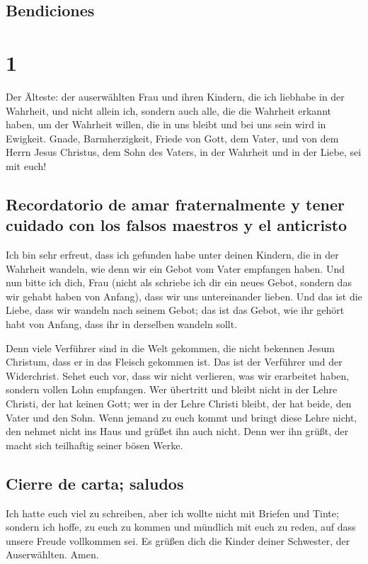 \hypertarget{bendiciones}{%
\subsection{Bendiciones}\label{bendiciones}}

\hypertarget{section}{%
\section{1}\label{section}}

 Der Älteste: der auserwählten Frau und ihren Kindern, die
ich liebhabe in der Wahrheit, und nicht allein ich, sondern auch alle,
die die Wahrheit erkannt haben,  um der Wahrheit willen,
die in uns bleibt und bei uns sein wird in Ewigkeit. 
Gnade, Barmherzigkeit, Friede von Gott, dem Vater, und von dem Herrn
Jesus Christus, dem Sohn des Vaters, in der Wahrheit und in der Liebe,
sei mit euch!

\hypertarget{recordatorio-de-amar-fraternalmente-y-tener-cuidado-con-los-falsos-maestros-y-el-anticristo}{%
\subsection{Recordatorio de amar fraternalmente y tener cuidado con los
falsos maestros y el
anticristo}\label{recordatorio-de-amar-fraternalmente-y-tener-cuidado-con-los-falsos-maestros-y-el-anticristo}}

 Ich bin sehr erfreut, dass ich gefunden habe unter deinen
Kindern, die in der Wahrheit wandeln, wie denn wir ein Gebot vom Vater
empfangen haben.  Und nun bitte ich dich, Frau (nicht als
schriebe ich dir ein neues Gebot, sondern das wir gehabt haben von
Anfang), dass wir uns untereinander lieben.  Und das ist
die Liebe, dass wir wandeln nach seinem Gebot; das ist das Gebot, wie
ihr gehört habt von Anfang, dass ihr in derselben wandeln sollt.

 Denn viele Verführer sind in die Welt gekommen, die nicht
bekennen Jesum Christum, dass er in das Fleisch gekommen ist. Das ist
der Verführer und der Widerchrist.  Sehet euch vor, dass
wir nicht verlieren, was wir erarbeitet haben, sondern vollen Lohn
empfangen.  Wer übertritt und bleibt nicht in der Lehre
Christi, der hat keinen Gott; wer in der Lehre Christi bleibt, der hat
beide, den Vater und den Sohn.  Wenn jemand zu euch kommt
und bringt diese Lehre nicht, den nehmet nicht ins Haus und grüßet ihn
auch nicht.  Denn wer ihn grüßt, der macht sich
teilhaftig seiner bösen Werke.

\hypertarget{cierre-de-carta-saludos}{%
\subsection{Cierre de carta; saludos}\label{cierre-de-carta-saludos}}

 Ich hatte euch viel zu schreiben, aber ich wollte nicht
mit Briefen und Tinte; sondern ich hoffe, zu euch zu kommen und mündlich
mit euch zu reden, auf dass unsere Freude vollkommen sei.
 Es grüßen dich die Kinder deiner Schwester, der
Auserwählten. Amen.
